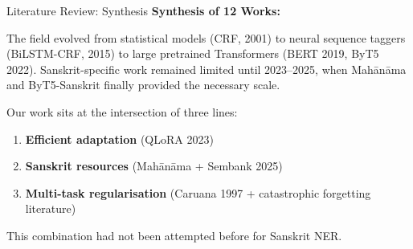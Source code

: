 \begin{frame}{Literature Review: Synthesis}
  \textbf{Synthesis of 12 Works:}

  The field evolved from statistical models (CRF, 2001) to neural sequence taggers (BiLSTM-CRF, 2015) to large pretrained Transformers (BERT 2019, ByT5 2022). Sanskrit-specific work remained limited until 2023–2025, when Mahānāma and ByT5-Sanskrit finally provided the necessary scale.

  Our work sits at the intersection of three lines:
  \begin{enumerate}
    \item \textbf{Efficient adaptation} (QLoRA 2023)
    \item \textbf{Sanskrit resources} (Mahānāma + Sembank 2025)
    \item \textbf{Multi-task regularisation} (Caruana 1997 + catastrophic forgetting literature)
  \end{enumerate}

  This combination had not been attempted before for Sanskrit NER.
\end{frame}

